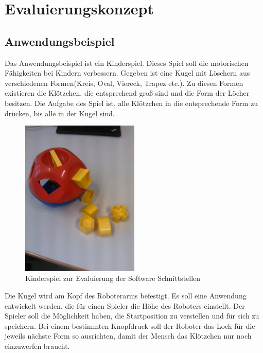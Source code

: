 \chapter{Evaluierungskonzept}
\label{konzept_kon}

\section{Anwendungsbeispiel}
\label{sec:anwendung_kon}

Das Anwendungsbeispiel ist ein Kinderspiel. Dieses Spiel soll die motorischen Fähigkeiten bei Kindern verbessern.
Gegeben ist eine Kugel mit Löschern aus verschiedenen Formen(Kreis, Oval, Viereck, Trapez etc.). Zu diesen Formen existieren die  Klötzchen, die entsprechend groß sind und die Form der Löcher besitzen. Die Aufgabe des Spiel ist, alle Klötzchen in die entsprechende Form zu drücken, bis alle in der Kugel sind.

\begin{figure}[H]
  \centering
    \includegraphics[width=0.5\textwidth]{pic/spiel.jpg}
      \caption[Kinder Geschicklichkeitsspiel]{Kinderspiel zur Evaluierung der Software Schnittstellen}
      \label{fig:kinderspiel}
\end{figure}
\newpage

Die Kugel wird am Kopf des Roboterarms befestigt. Es soll eine Anwendung entwickelt werden, die für einen Spieler die Höhe des Roboters einstellt. Der Spieler soll die Möglichkeit haben, die Startposition zu verstellen und für sich zu speichern. Bei einem bestimmten Knopfdruck soll der Roboter das Loch für die jeweils nächste Form so ausrichten, damit der Mensch das Klötzchen nur noch einzuwerfen braucht.


